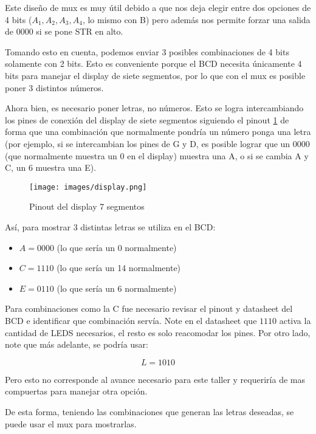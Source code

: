 \documentclass[12pt,a4paper]{article}
\begin{document}
Este diseño de mux es muy útil debido a que nos deja elegir entre dos opciones de 4 bits ($A_1,A_2,A_3,A_4$, lo mismo con B) pero además nos permite forzar una salida de $0000$ si se pone STR en alto.

Tomando esto en cuenta, podemos enviar 3 posibles combinaciones de 4 bits solamente con 2 bits. Esto es conveniente porque el BCD necesita únicamente 4 bits para manejar el display de siete segmentos, por lo que con el mux es posible poner 3 distintos números. 

Ahora bien, es necesario poner letras, no números. Esto se logra intercambiando los pines de conexión del display de siete segmentos \cite{XLITX_5621BS} siguiendo el pinout \ref{fig:7seg} de forma que una combinación que normalmente pondría un número ponga una letra (por ejemplo, si se intercambian los pines de G y D, es posible lograr que un 0000 (que normalmente muestra un 0 en el display) muestra una A, o si se cambia A y C, un 6 muestra una E).

\begin{figure}[h!] %
    \centering    
    \texttt{[image: images/display.png]} %
    \caption{Pinout del display 7 segmentos \cite{XLITX_5621BS}}
    \label{fig:7seg}
\end{figure}

Así, para mostrar 3 distintas letras se utiliza en el BCD:

\begin{itemize}
    \item $ A = 0000 $ (lo que sería un 0 normalmente)
    \item $ C = 1110 $ (lo que sería un 14 normalmente)
    \item $ E = 0110 $ (lo que sería un 6 normalmente)
\end{itemize}

Para combinaciones como la C fue necesario revisar el pinout y datasheet del BCD e identificar que combinación servía. Note en el datasheet \cite{TI_SN74LS47} que $1110$ activa la cantidad de LEDS necesarios, el resto es solo reacomodar los pines. Por otro lado, note que más adelante, se podría usar:

\[ L = 1010 \]

Pero esto no corresponde al avance necesario para este taller y requeriría de mas compuertas para manejar otra opción.

De esta forma, teniendo las combinaciones que generan las letras deseadas, se puede usar el mux para mostrarlas.
\end{document}
